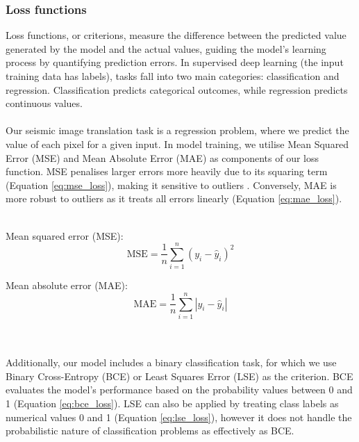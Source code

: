 \subsubsection{Loss functions}
Loss functions, or criterions, measure the difference between the predicted value generated by the model and the actual values, guiding the model's learning process by quantifying prediction errors. In supervised deep learning (the input training data has labels), tasks fall into two main categories: classification and regression. Classification predicts categorical outcomes, while regression predicts continuous values.
\\\\
Our seismic image translation task is a regression problem, where we predict the value of each pixel for a given input. In model training, we utilise Mean Squared Error (MSE) and Mean Absolute Error (MAE) as components of our loss function. MSE penalises larger errors more heavily due to its squaring term (Equation \ref{eq:mse_loss}), making it sensitive to outliers \cite{chen2022novel}. Conversely, MAE is more robust to outliers as it treats all errors linearly (Equation \ref{eq:mae_loss}).
\\\\
\begin{minipage}{0.5\textwidth}
	Mean squared error (MSE):
	\begin{equation}
		\mathrm{MSE}=\frac{1}{n} \sum_{i=1}^n\left(y_i-\hat{y}_i\right)^2
		\label{eq:mse_loss}
	\end{equation}
\end{minipage}%
\begin{minipage}{0.5\textwidth}
	Mean absolute error (MAE):
	\begin{equation}
		\mathrm{MAE}=\frac{1}{n} \sum_{i=1}^n\left|y_i-\hat{y}_i\right|
		\label{eq:mae_loss}
	\end{equation}
\end{minipage}
\\\\
Additionally, our model includes a binary classification task, for which we use Binary Cross-Entropy (BCE) or Least Squares Error (LSE) as the criterion. BCE evaluates the model's performance based on the probability values between 0 and 1 (Equation \ref{eq:bce_loss}).  LSE can also be applied by treating class labels as numerical values 0 and 1 (Equation \ref{eq:lse_loss}), however it does not handle the probabilistic nature of classification problems as effectively as BCE.
\\\\
